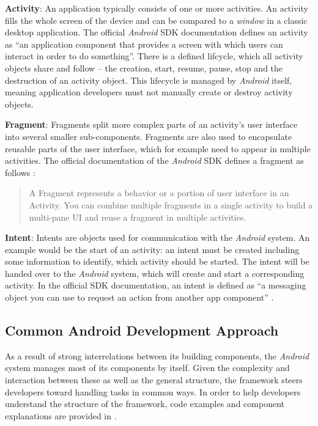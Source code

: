\textbf{Activity}: An application typically consists of one or more activities. An activity fills the whole screen of the device and can be compared to a \emph{window} in a classic desktop application. The official \emph{Android} SDK documentation \cite{SDKActivities} defines an activity as \enquote{an application component that provides a screen with which users can interact in order to do something}.
There is a defined lifcycle, which all activity objects share and follow -- the creation, start, resume, pause, stop and the destruction of an activity object. This lifecycle is managed by \emph{Android} itself, meaning application developers must not manually create or destroy activity objects.

\textbf{Fragment}: Fragments split more complex parts of an activity's user interface into several smaller sub-components. Fragments are also used to encapsulate reusable parts of the user interface, which for example need to appear in multiple activities. The official documentation of the \emph{Android} SDK defines a fragment as follows \cite{SDKFragments}:

\begin{quote}
A Fragment represents a behavior or a portion of user interface in an Activity. You can combine multiple fragments in a single activity to build a multi-pane UI and reuse a fragment in multiple activities.
\end{quote}

\textbf{Intent}: Intents are objects used for communication with the \emph{Android} system. An example would be the start of an activity: an intent must be created including some information to identify, which activity should be started. The intent will be handed over to the \emph{Android} system, which will create and start a corresponding activity. In the official SDK documentation, an intent is defined as \enquote{a messaging object you can use to request an action from another app component} \cite{SDKIntents}.

\subsection{Common Android Development Approach}
As a result of strong interrelations between its building components, the \emph{Android} system manages most of its components by itself. Given the complexity and interaction between these as well as the general structure, the framework steers developers toward handling tasks in common ways. In order to help developers understand the structure of the framework, code examples and component explanations are provided in \cite{SDKComponents}.

